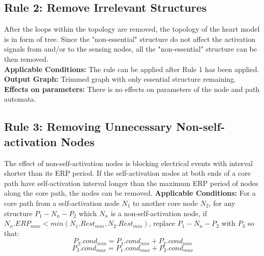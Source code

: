 \subsection{Rule 2: Remove Irrelevant Structures}
After the loops within the topology are removed, the topology of the heart model is in form of tree. Since the "non-essential" structure do not affect the activation signals from and/or to the sensing nodes, all the "non-essential" structure can be then removed.\\
\textbf{Applicable Conditions: }The rule can be applied after Rule 1 has been applied.\\
\textbf{Output Graph: } Trimmed graph with only essential structure remaining.\\
\textbf{Effects on parameters: } There is no effects on parameters of the node and path automata.
 
\subsection{Rule 3: Removing Unnecessary Non-self-activation Nodes}
The effect of non-self-activation nodes is blocking electrical events with interval shorter than its ERP period. If the self-activation nodes at both ends of a core path have self-activation interval longer than the maximum ERP period of nodes along the core path, the nodes can be removed.
\textbf{Applicable Conditions: }
For a core path from a self-activation node $N_1$ to another core node $N_2$, for any structure $P_1-N_n-P_2$ which $N_n$ is a non-self-activation node, if $N_n.ERP_{max}<min(N_1.Rest_{min},N_2.Rest_{min})$, replace $P_1-N_n-P_2$ with $P_3$ so that:
$$P_3.cond_{min}=P_1.cond_{min}+P_2.cond_{min}$$
$$P_3.cond_{max}=P_1.cond_{max}+P_2.cond_{max}$$

